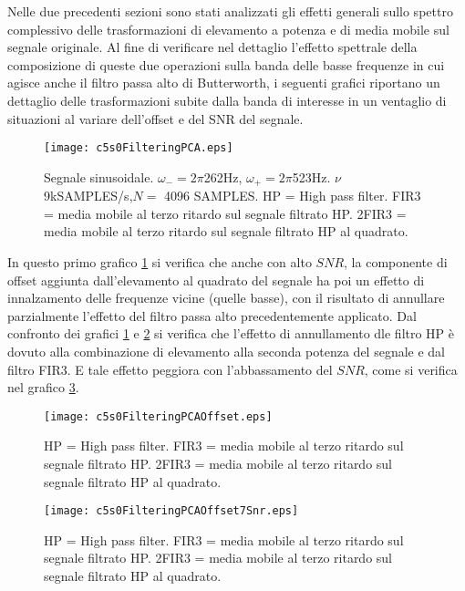 Nelle due precedenti sezioni sono stati analizzati gli effetti generali sullo spettro complessivo delle trasformazioni di elevamento a potenza e di media mobile sul segnale originale. Al fine di verificare nel dettaglio l'effetto spettrale della composizione di queste due operazioni sulla banda delle basse frequenze in cui agisce anche il filtro passa alto di Butterworth, i seguenti grafici riportano un dettaglio delle trasformazioni subite dalla banda di interesse in un ventaglio di situazioni al variare dell'offset e del SNR del segnale.

\begin{figure}%
\centering    
\texttt{[image: c5s0FilteringPCA.eps]}
\caption[Effetto spettrale della PCA. Segnale senza rumore]
{Segnale sinusoidale. $\omega_{-}=2\pi$262Hz, $\omega_{+}=2\pi$523Hz. $
\nu$ 9kSAMPLES/s,$N=$ 4096 SAMPLES. HP = High pass filter. FIR3 = media mobile al terzo ritardo sul segnale filtrato HP. 2FIR3 = media mobile al terzo ritardo sul segnale filtrato HP al quadrato. }
\label{fig:c5s0FilteringPCA}
\end{figure}

In questo primo grafico \ref{fig:c5s0FilteringPCA} si verifica che anche con alto $SNR$, la componente di offset aggiunta dall'elevamento al quadrato del segnale ha poi un effetto di innalzamento delle frequenze vicine (quelle basse), con il risultato di annullare parzialmente l'effetto del filtro passa alto precedentemente applicato.
Dal confronto dei grafici \ref{fig:c5s0FilteringPCA} e \ref{fig:c5s0FilteringPCAOffset} si verifica che l'effetto di annullamento dle filtro HP è dovuto alla combinazione di elevamento alla seconda potenza del segnale e dal filtro FIR3. E tale effetto peggiora con l'abbassamento del $SNR$, come si verifica nel grafico \ref{fig:c5s0FilteringPCAOffset7Snr}.


\begin{figure}%
\centering    
\texttt{[image: c5s0FilteringPCAOffset.eps]}
\caption[Effetto spettrale della PCA. Offset]
{HP = High pass filter. FIR3 = media mobile al terzo ritardo sul segnale filtrato HP. 2FIR3 = media mobile al terzo ritardo sul segnale filtrato HP al quadrato. }
\label{fig:c5s0FilteringPCAOffset}
\end{figure}


\begin{figure}%
\centering    
\texttt{[image: c5s0FilteringPCAOffset7Snr.eps]}
\caption[Effetto spettrale della PCA. Offset e SNR 7]
{HP = High pass filter. FIR3 = media mobile al terzo ritardo sul segnale filtrato HP. 2FIR3 = media mobile al terzo ritardo sul segnale filtrato HP al quadrato. }
\label{fig:c5s0FilteringPCAOffset7Snr}
\end{figure}

